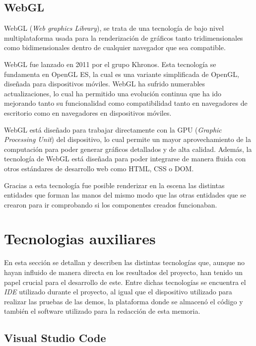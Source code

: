 \documentclass[a4paper, 12pt]{book}
\begin{document}
\subsection{WebGL}
\label{subsec:WebGL}
WebGL \cite{webgl_encodebiz} (\textit{Web graphics Library}), se trata de una tecnología de bajo nivel multiplataforma usada para la renderización de gráficos tanto tridimensionales como bidimensionales dentro de cualquier navegador que sea compatible.

WebGL fue lanzado en 2011 por el grupo Khronos. Esta tecnología se fundamenta en OpenGL ES, la cual es una variante simplificada de OpenGL, diseñada para dispositivos móviles. WebGL \cite{matsuda2013} ha sufrido numerables actualizaciones, 
lo cual ha permitido una evolución continua que ha ido mejorando tanto su funcionalidad como compatibilidad tanto en navegadores de escritorio como en navegadores en dispositivos móviles. 

WebGL está diseñado para trabajar directamente con la GPU (\textit{Graphic Processing Unit}) del dispositivo, lo cual permite un mayor aprovechamiento de la computación para poder generar gráficos detallados y de alta calidad. 
Además, la tecnología de WebGL está diseñada para poder integrarse de manera fluida con otros estándares de desarrollo web como HTML, CSS o DOM. 

Gracias a esta tecnología fue posible renderizar en la escena las distintas entidades que forman las manos del mismo modo que las otras entidades que se crearon para ir comprobando si los componentes creados funcionaban.

\section{Tecnologias auxiliares}
\label{sec:tecnologias-auxiliares}
En esta sección se detallan y describen las distintas tecnologías que, aunque no hayan influido de manera directa en los resultados del proyecto, han tenido un papel crucial para el desarrollo de este.
Entre dichas tecnologías se encuentra el \textit{IDE} utilizado durante el proyecto, al igual que el dispositivo utilizado para realizar las pruebas de las demos, la plataforma donde se almacenó el código y también el software utilizado para la redacción de esta memoria.

\subsection{Visual Studio Code}
\label{subsec: visualstudiocode}
\end{document}
